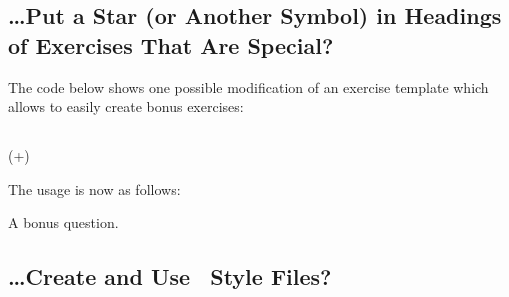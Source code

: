 \documentclass{xsim-manual}
\begin{document}
\subsection{\dots Put a Star (or Another Symbol) in Headings of Exercises That
  Are Special?}

The code below shows one possible modification of an exercise template which
allows to easily create bonus exercises:
\begin{sourcecode}
  \usepackage{amsymb}
    {%
      \subsection*
        {%
          \XSIMmixedcase{\GetExerciseName}\nobreakspace
          \IfInsideSolutionF
            {%
                { {\normalfont\itshape{}}}%
            }%
        }
        {%
          \marginpar
            {%
              \IfInsideSolutionF{\rule{1.2cm}{1pt}\slash}%
              \PropertyValue
                {\nobreakspace(+\PropertyValue)}%
              \nobreakspace{}%
            }%
        }%
    }
    {}
\end{sourcecode}

The usage is now as follows:
\begin{example}
  \begin{exercise}[bonus]
    A bonus question.
  \end{exercise}
\end{example}

\subsection{\dots Create and Use \xsim\ Style Files?}\label{sec:style-files}
\end{document}
